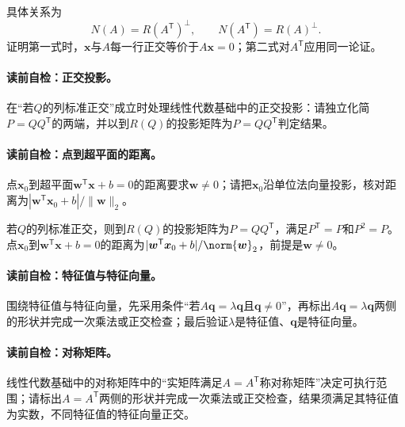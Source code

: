 具体关系为
\[
N(A)=R(A^{\mathsf T})^{\perp},\qquad
N(A^{\mathsf T})=R(A)^{\perp}.
\]
证明第一式时，$\boldsymbol{x}$与$A$每一行正交等价于$A\boldsymbol{x}=0$；第二式对$A^{\mathsf T}$应用同一论证。

\paragraph{读前自检：正交投影。}在“若$Q$的列标准正交”成立时处理线性代数基础中的正交投影：请独立化简$P=QQ^{\mathsf T}$的两端，并以到$R(Q)$的投影矩阵为$P=QQ^{\mathsf T}$判定结果。\par
\paragraph{读前自检：点到超平面的距离。}点$\boldsymbol x_0$到超平面$\boldsymbol w^{\mathsf T}\boldsymbol x+b=0$的距离要求$\boldsymbol w\ne0$；请把$\boldsymbol x_0$沿单位法向量投影，核对距离为$|\boldsymbol w^{\mathsf T}\boldsymbol x_0+b|/\lVert\boldsymbol w\rVert_2$。\par

若$Q$的列标准正交，则到$R(Q)$的投影矩阵为$P=QQ^{\mathsf T}$，满足$P^{\mathsf T}=P$和$P^2=P$。
点$\boldsymbol{x}_0$到$\boldsymbol{w}^{\mathsf T}\boldsymbol{x}+b=0$的距离为$|\boldsymbol{w}^{\mathsf T}\boldsymbol{x}_0+b|/\norm{\boldsymbol{w}}_2$，前提是$\boldsymbol{w}\ne0$。


\paragraph{读前自检：特征值与特征向量。}围绕特征值与特征向量，先采用条件“若$A\boldsymbol{q}=\lambda\boldsymbol{q}$且$\boldsymbol{q}\ne0$”，再标出$A\boldsymbol{q}=\lambda\boldsymbol{q}$两侧的形状并完成一次乘法或正交检查；最后验证$\lambda$是特征值、$\boldsymbol{q}$是特征向量。\par
\paragraph{读前自检：对称矩阵。}线性代数基础中的对称矩阵中的“实矩阵满足$A=A^{\mathsf T}$称对称矩阵”决定可执行范围；请标出$A=A^{\mathsf T}$两侧的形状并完成一次乘法或正交检查，结果须满足其特征值为实数，不同特征值的特征向量正交。\par

